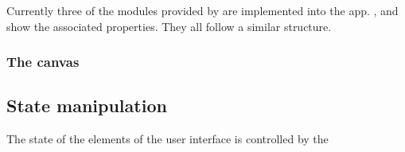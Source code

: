 Currently three of the modules provided by  are implemented into the app.
,  and  show the associated properties.
They all follow a similar structure.


\subsubsection{The canvas}

\subsection{State manipulation} \label{ch:state_manipulation}

The state of the elements of the user interface is controlled by the 
